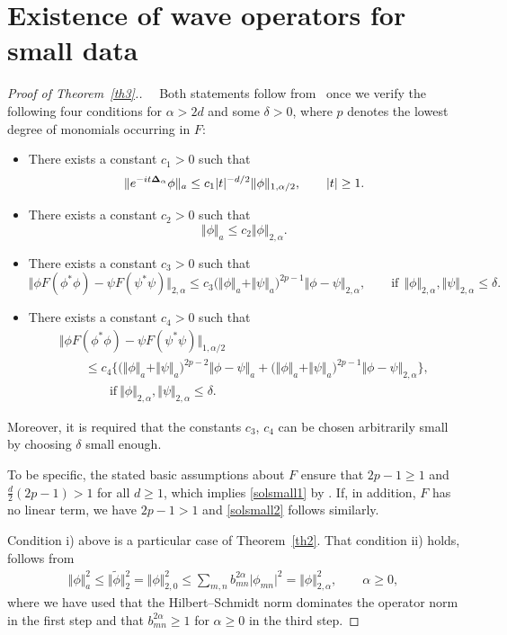 \section{Existence of wave operators for small data}
\label{secth3}

\begin{proof}[Proof of Theorem~\ref{th3}.]
~~Both statements follow from~ \cite[Theorem 16]{Reed} once we verify
the following four conditions for $\alpha> 2d$ and some $\delta>0$,
where $p$ denotes the lowest degree of monomials occurring in $F$:
\begin{itemize}\itemsep=0pt
\item[i)] There exists a constant $c_1>0$ such that
\[
\Vert e^{-it{\bf{\Delta}}_\alpha}\phi\Vert_a\leq
c_1 |t|^{-d/2} \Vert\phi\Vert_{1,\alpha/2},\qquad |t|\geq 1 .
\]
\item[ii)] There exists a constant $c_2>0$ such that
\[
\Vert\phi\Vert_a\leq c_2 \Vert\phi\Vert_{2,\alpha} .
\]
\item[iii)] There  exists a constant $c_3>0$ such that
\[
\Vert\phi F(\phi^*\phi)-\psi F(\psi^*\psi)\Vert_{2,\alpha}
\leq c_3\big(\Vert\phi\Vert_a+\Vert\psi\Vert_a\big)^{2p-1}
\Vert\phi-\psi\Vert_{2,\alpha} ,\qquad \mbox{if}\ \ \Vert\phi\Vert_{2,\alpha},
\Vert\psi\Vert_{2,\alpha}\leq\delta .
\]
\item[iv)]  There  exists a constant $c_4>0$ such that
\begin{gather*}
\Vert\phi F(\phi^*\phi)-\psi F(\psi^*\psi)\Vert_{1,\alpha/2}\\
\qquad {} \leq c_4\Big\{\big(\Vert\phi\Vert_a+\Vert\psi\Vert_a\big)^{2p-2}
\Vert\phi-\psi\Vert_a
  +
\big(\Vert\phi\Vert_a+\Vert\psi\Vert_a\big)^{2p-1}
\Vert\phi-\psi\Vert_{2,\alpha}\Big\} ,\\
\qquad \qquad \mbox{if} \ \Vert\phi\Vert_{2,\alpha},
\Vert\psi\Vert_{2,\alpha}\leq\delta .
\end{gather*}
\end{itemize}
Moreover, it is required that the constants $c_3$, $c_4$ can be chosen
arbitrarily small by choosing $\delta$ small enough.

To be specif\/ic, the stated basic assumptions about $F$ ensure that
 $2p-1\geq 1$ and $\frac d2(2p-1)> 1$ for all
$d\geq 1$, which implies \eqref{solsmall1} by  \cite[Theorem
16]{Reed}. If, in addition, $F$ has no linear term, we have $2p-1>1$
and \eqref{solsmall2} follows similarly.

Condition i) above is a particular case of Theorem~\ref{th2}. That
condition ii) holds, follows from
\begin{gather*}%
\Vert\phi\Vert_a^2 \leq \Vert\widetilde\phi\Vert^2_2 = \Vert\phi\Vert_{2,0}^2 \leq
\sum_{m,n}b_{mn}^{2\alpha}\big|\phi_{mn}\big|^2 = \Vert\phi\Vert^2_{2,\alpha},\qquad \alpha\geq0,
\end{gather*}
where we have used that the Hilbert--Schmidt norm dominates the operator
norm in the f\/irst step and that $b^{2\alpha}_{mn}\geq 1$ for
$\alpha\geq 0$ in the third step.


\end{proof}

